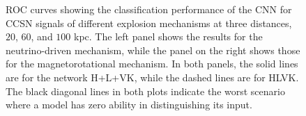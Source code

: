 \documentclass[aps,twocolumn,showpacs,groupedaddress, nofootinbib]{revtex4}  %
\begin{document}
\begin{figure}
     \begin{center}
        \quad
    \end{center}
    \caption{\ac{ROC} curves showing the classification performance of the
\ac{CNN} for \ac{CCSN} signals of different explosion mechanisms at three
distances, $20$, $60$, and $100$ kpc. The left panel shows the results for the
neutrino-driven mechanism, while the panel on the right shows those for the
magnetorotational mechanism. In both panels, the solid lines are for the
network H+L+VK, while the dashed lines are for HLVK. The black diagonal lines in both plots indicate 
the worst scenario where a model has zero ability in distinguishing its input.
\label{fig:ROClog}} 
\end{figure}
\end{document}
